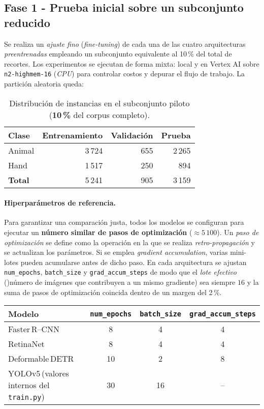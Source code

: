 \subsection*{Fase 1 - Prueba inicial sobre un subconjunto reducido}

Se realiza un \emph{ajuste fino} (\emph{fine-tuning}) de cada una de las cuatro arquitecturas \emph{preentrenadas} empleando un subconjunto equivalente al 10\,\% del total de recortes.
Los experimentos se ejecutan de forma mixta: local y en Vertex AI sobre \texttt{n2-highmem-16} (\emph{CPU}) para controlar costos y depurar el flujo de trabajo.
La partición aleatoria queda:

\begin{table}[!h]
    \centering
    \begin{tabular}{l r r r}
        \hline
        \textbf{Clase} & \textbf{Entrenamiento} & \textbf{Validación} & \textbf{Prueba} \\
        \hline
        Animal & 3\,724 & 655 & 2\,265 \\
        Hand   & 1\,517 & 250 &   894 \\
        \hline
        \textbf{Total} & 5\,241 & 905 & 3\,159 \\
    \end{tabular}
    \caption{Distribución de instancias en el subconjunto piloto (\textbf{10\,\%} del corpus completo).}
    \label{tab:pilot_split}
\end{table}

\paragraph{Hiperparámetros de referencia.}
Para garantizar una comparación justa, todos los modelos se configuran para ejecutar un \textbf{número similar de pasos de optimización} (\(\approx 5\,100\)).
Un \emph{paso de optimización} se define como la operación en la que se realiza \emph{retro-propagación} y se actualizan los parámetros.
Si se emplea \textit{gradient accumulation}, varias mini-lotes pueden acumularse antes de dicho paso.
En cada arquitectura se ajustan \texttt{num\_epochs}, \texttt{batch\_size} y \texttt{grad\_accum\_steps} de modo que el \emph{lote efectivo} ()número de imágenes que contribuyen a un mismo gradiente) sea siempre \(16\) y la suma de pasos de optimización coincida dentro de un margen del 2\,\%.

\begin{center}
\begin{tabular}{lccc}
\hline
\textbf{Modelo} & \texttt{num\_epochs} & \texttt{batch\_size} & \texttt{grad\_accum\_steps} \\
\hline
Faster\,R--CNN   & 8  & 4  & 4  \\
RetinaNet        & 8  & 4  & 4  \\
Deformable\,DETR & 10 & 2  & 8  \\
YOLOv5\,(valores internos del \texttt{train.py}) & 30 & 16 & -- \\
\hline
\end{tabular}
\end{center}

